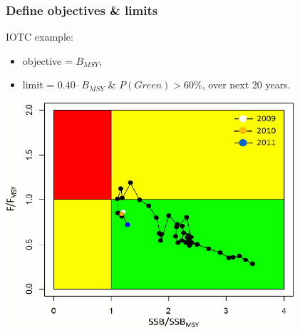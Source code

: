 \documentclass{beamer}
\begin{document}
\begin{frame}
\frametitle{Define objectives \& limits}

IOTC example: 
\begin{itemize}	
	\item objective = $B_{MSY}$, 
	\item limit = $0.40\cdot B_{MSY}$ \& $P(Green) > 60\%$, over next 20
years.
\end{itemize}	

\vspace{1em}

\centering
\includegraphics[height=0.5\textheight]{figs/kobe.png}

\end{frame}
\end{document}
